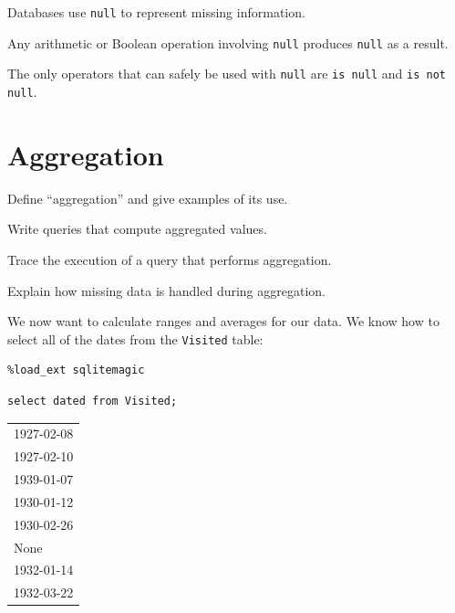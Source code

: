 \documentclass{book}
\begin{document}
\begin{keypoints}
\begin{swcitemize}
\item
  Databases use \texttt{null} to represent missing information.
\item
  Any arithmetic or Boolean operation involving \texttt{null} produces
  \texttt{null} as a result.
\item
  The only operators that can safely be used with \texttt{null} are
  \texttt{is null} and \texttt{is not null}.
\end{swcitemize}
\end{keypoints}

\section{Aggregation}

\begin{objectives}
\begin{swcitemize}
\item
  Define ``aggregation'' and give examples of its use.
\item
  Write queries that compute aggregated values.
\item
  Trace the execution of a query that performs aggregation.
\item
  Explain how missing data is handled during aggregation.
\end{swcitemize}
\end{objectives}

We now want to calculate ranges and averages for our data. We know how
to select all of the dates from the \texttt{Visited} table:

\begin{verbatim}
%load_ext sqlitemagic
\end{verbatim}

\begin{verbatim}
select dated from Visited;
\end{verbatim}

\begin{tabular}{l}
1927-02-08 \\
1927-02-10 \\
1939-01-07 \\
1930-01-12 \\
1930-02-26 \\
None \\
1932-01-14 \\
1932-03-22 \\
\end{tabular}
\end{document}
